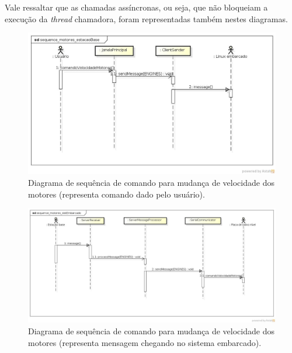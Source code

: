 Vale ressaltar que as chamadas assíncronas, ou seja, que não bloqueiam a execução da \textit{thread} chamadora, foram representadas também nestes diagramas.

\begin{figure}[H]
  \centering
  \includegraphics[width=\textwidth, keepaspectratio]{./figuras/estacaoBase/sequence_motores_estacaoBase.jpg}
  \caption{Diagrama de sequência de comando para mudança de velocidade dos motores (representa comando dado pelo usuário).}
  \label{fig:diagrama_sequencia_motores_estacao_base}
\end{figure}

\begin{figure}[H]
  \centering
  \includegraphics[width=\textwidth, keepaspectratio]{./figuras/sistEmbarcado/sequence_motores_sistEmbarcado.jpg}
  \caption{Diagrama de sequência de comando para mudança de velocidade dos motores (representa mensagem chegando no sistema embarcado).}
  \label{fig:diagrama_sequencia_motores_sist_embarcado}
\end{figure}

